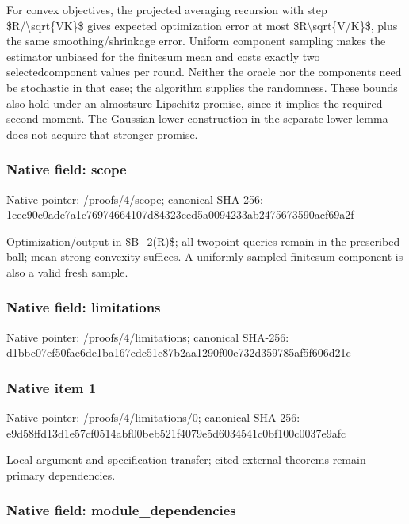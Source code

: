 \documentclass[10pt,a4paper]{article}
\begin{document}
For convex objectives, the projected averaging recursion with step \$R/\textbackslash{}sqrt\{VK\}\$ gives expected optimization error at most \$R\textbackslash{}sqrt\{V/K\}\$, plus the same smoothing/shrinkage error. Uniform component sampling makes the estimator unbiased for the finitesum mean and costs exactly two selectedcomponent values per round. Neither the oracle nor the components need be stochastic in that case; the algorithm supplies the randomness. These bounds also hold under an almostsure Lipschitz promise, since it implies the required second moment. The Gaussian lower construction in the separate lower lemma does not acquire that stronger promise.


\subsubsection{Native field: scope}


Native pointer: /proofs/4/scope; canonical SHA-256: 1cee90c0ade7a1c769746641\allowbreak{}07d84323ced5a0094233ab24\allowbreak{}75673590acf69a2f


Optimization/output in \$B\_2(R)\$; all twopoint queries remain in the prescribed ball; mean strong convexity suffices. A uniformly sampled finitesum component is also a valid fresh sample.


\subsubsection{Native field: limitations}


Native pointer: /proofs/4/limitations; canonical SHA-256: d1bbc07ef50fae6de1ba167e\allowbreak{}dc51c87b2aa1290f00e732d3\allowbreak{}59785af5f606d21c



\subsubsection{Native item 1}


Native pointer: /proofs/4/limitations/0; canonical SHA-256: e9d58ffd13d1e57cf0514abf\allowbreak{}00beb521f4079e5d6034541c\allowbreak{}0bf100c0037e9afc


Local argument and specification transfer; cited external theorems remain primary dependencies.


\subsubsection{Native field: module\_dependencies}
\end{document}
